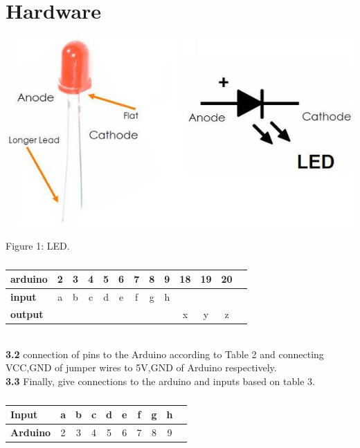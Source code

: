 \documentclass[10pt, a4paper]{article}
\begin{document}
	\section{Hardware}
    \begin{center}
\includegraphics[scale=.20]{led.jpeg}
\end{center}
Figure 1: LED.
	\begin{table}[htbp]
    \begin{center}
    \begin{tabular}{|l|c|c|c|c|c|c|c|c|c|c|c|c} \hline \textbf{arduino}
  & 2 & 3 & 4 & 5 & 6 & 7 & 8 & 9 & 18 & 19 & 20 \\
 \hline
 \textbf{input} & a & b & c & d & e & f & g & h & & &  \\ \hline
\textbf{output} & & & & & & & &  & x & y & z \\ \hline
\end{tabular}   
\end{center}
\caption{\label{table:dummytable} }
\end{table}
\\	\textbf{3.2}
	connection of pins to the Arduino according to Table 2 and connecting VCC,GND of jumper wires to 5V,GND of Arduino respectively.
\\ \textbf{3.3}
Finally, give connections to the arduino and inputs based on table 3.
	\begin{table}[htbp]
    \begin{center}
    \begin{tabular}{|l|c|c|c|c|c|c|c|c|c|} \hline 
 
\textbf{Input} & a & b & c & d & e & f & g & h  \\ \hline
\textbf{Arduino} & 2 & 3 & 4 & 5& 6 & 7 & 8 & 9\\ \hline
\end{tabular}   
\end{center}
\caption{\label{table:dummytable} }
\end{table}
\end{document}

